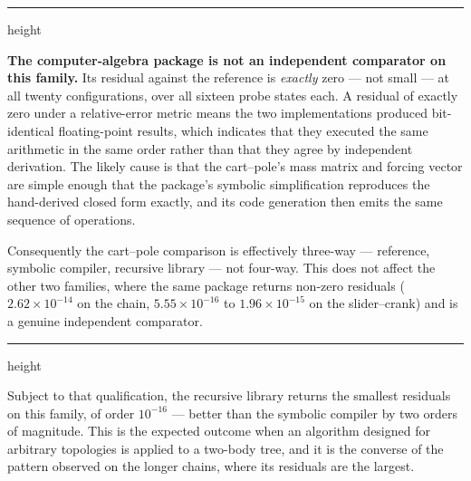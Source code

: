 \documentclass[review,12pt]{elsarticle}
\newenvironment{callout}
  {\par\medskip
   {\color{warnrule}\hrule height\arrayrulewidth}%
   \nobreak\medskip\noindent}
  {\par\medskip
   {\color{warnrule}\hrule height\arrayrulewidth}%
   \medskip}
\begin{document}
\FloatBarrier
\begin{callout}
\textbf{The computer-algebra package is not an independent comparator on this
family.} Its residual against the reference is \emph{exactly} zero --- not small
--- at all twenty configurations, over all sixteen probe states each. A residual
of exactly zero under a relative-error metric means the two implementations
produced bit-identical floating-point results, which indicates that they
executed the same arithmetic in the same order rather than that they agree by
independent derivation. The likely cause is that the cart--pole's mass matrix
and forcing vector are simple enough that the package's symbolic simplification
reproduces the hand-derived closed form exactly, and its code generation then
emits the same sequence of operations.

Consequently the cart--pole comparison is effectively three-way --- reference,
symbolic compiler, recursive library --- not four-way. This does not affect the
other two families, where the same package returns non-zero residuals
($2.62\times10^{-14}$ on the chain, $5.55\times10^{-16}$ to
$1.96\times10^{-15}$ on the slider--crank) and is a genuine independent
comparator.
\end{callout}

\noindent Subject to that qualification, the recursive library returns the
smallest residuals on this family, of order $10^{-16}$ --- better than the
symbolic compiler by two orders of magnitude. This is the expected outcome when
an algorithm designed for arbitrary topologies is applied to a two-body tree,
and it is the converse of the pattern observed on the longer chains, where its
residuals are the largest.
\end{document}
